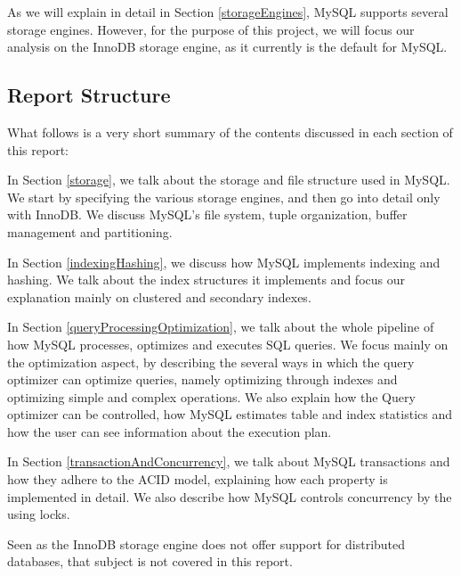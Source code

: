 \documentclass[12pt]{article}
\begin{document}
As we will explain in detail in Section \ref{storageEngines}, MySQL supports several storage engines. However, for the purpose of this project, we will focus our analysis on the InnoDB storage engine, as it currently is the default for MySQL.


\subsection{Report Structure}
\label{structure}
What follows is a very short summary of the contents discussed in each section of this report:

\vspace{0.3cm}

In Section \ref{storage}, we talk about the storage and file structure used in MySQL. We start by specifying the various storage engines, and then go into detail only with InnoDB. We discuss MySQL's file system, tuple organization, buffer management and partitioning.

\vspace{0.2cm}

In Section \ref{indexingHashing}, we discuss how MySQL implements indexing and hashing. We talk about the index structures it implements and focus our explanation mainly on clustered and secondary indexes.

\vspace{0.2cm}

In Section \ref{queryProcessingOptimization}, we talk about the whole pipeline of how MySQL processes, optimizes and executes SQL queries. We focus mainly on the optimization aspect, by describing the several ways in which the query optimizer can optimize queries, namely optimizing through indexes and optimizing simple and complex operations. We also explain how the Query optimizer can be controlled, how MySQL estimates table and index statistics and how the user can see information about the execution plan.

\vspace{0.2cm}

In Section \ref{transactionAndConcurrency}, we talk about MySQL transactions and how they adhere to the ACID model, explaining how each property is implemented in detail. We also describe how MySQL controls concurrency by the using locks.

\vspace{0.2cm}

Seen as the InnoDB storage engine does not offer support for distributed databases, that subject is not covered in this report.
\end{document}
